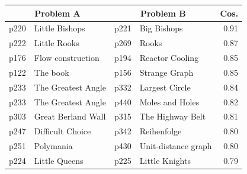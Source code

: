 \begin{tabular}{rlrlr}
\toprule
\multicolumn{2}{c}{Problem A} & \multicolumn{2}{c}{Problem B} & Cos. \\
\midrule
p220 & Little Bishops & p221 & Big Bishops & 0.91 \\
p222 & Little Rooks & p269 & Rooks & 0.87 \\
p176 & Flow construction & p194 & Reactor Cooling & 0.85 \\
p122 & The book & p156 & Strange Graph & 0.85 \\
p233 & The Greatest Angle & p332 & Largest Circle & 0.84 \\
p233 & The Greatest Angle & p440 & Moles and Holes & 0.82 \\
p303 & Great Berland Wall & p315 & The Highway Belt & 0.81 \\
p247 & Difficult Choice & p342 & Reihenfolge & 0.80 \\
p251 & Polymania & p430 & Unit-distance graph & 0.80 \\
p224 & Little Queens & p225 & Little Knights & 0.79 \\
\bottomrule
\end{tabular}
